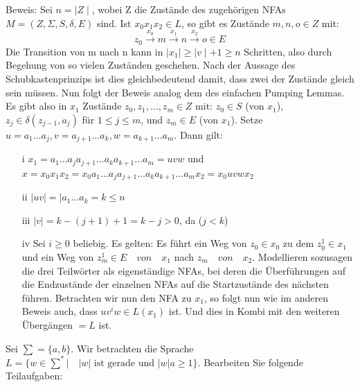 \documentclass[10pt, a4paper]{exam}
\begin{document}
\begin{questions}
\begin{solution}
        Beweis: Sei $n=\mid Z\mid$, wobei Z die Zustände des zugehörigen NFAs $M=(Z,\Sigma,S,\delta,E)$ sind. Ist $x_0x_1x_2 \in L$, so gibt es Zustände $m,n,o\in Z$ mit: $$z_0 \xrightarrow{x_0} m \xrightarrow{x_1} n \xrightarrow{x_2} o \in E$$
        Die Transition von m nach n kann in $\mid x_1\mid\geq\mid v\mid +1 \geq n$ Schritten, also durch Begehung von so vielen Zuständen geschehen. Nach der Aussage des Schubkastenprinzips ist dies gleichbedeutend damit, dass zwei der Zustände gleich sein müssen. Nun folgt der Beweis analog dem des einfachen Pumping Lemmas.\\
        Es gibt also in $x_1$ Zustände $z_0,z_1,…,z_m\in Z$ mit: $z_0\in S$ (von $x_1$), $z_j \in \delta(z_{j-1},a_j)$ für $1\leq j\leq m$, und $z_m\in E$ (von $x_1$).
        Setze $u = a_1 … a_j, v = a_{j+1}…a_k, w=a_{k+1}…a_m$.
        Dann gilt:
        \begin{itemize}
            \item[i] $x_1 = a_1…a_ja_{j+1}…a_ka_{k+1}…a_m = uvw$ und $x=x_0x_1x_2 = x_0a_1…a_ja_{j+1}…a_ka_{k+1}…a_mx_2 = x_0uvwx_2$
            \item[ii] $\mid uv\mid=\mid a_1…a_k = k \leq n$
            \item[iii] $\mid v\mid = k -(j+1)+1 = k-j > 0$, da ($j < k$)
            \item[iv] Sei $i\geq 0$ beliebig. Es gelten:
                  Es führt ein Weg von $z_0\in x_0$ zu dem $z_0^1 \in x_1$ und ein Weg von $z_m^1 \in E \quad von \quad x_1$ nach $z_m \quad von \quad x_2$. Modellieren sozusagen die drei Teilwörter als eigenständige NFAs, bei deren die Überführungen auf die Endzustände der einzelnen NFAs auf die Startzustände des nächsten führen. Betrachten wir nun den NFA zu $x_1$, so folgt nun wie im anderen Beweis auch, dass $uv^iw \in L(x_1)$ ist. Und dies in Kombi mit den weiteren Übergängen $=L$ ist.
        \end{itemize}
    \end{solution}

    \question Sei $\sum=\{a, b\}$. Wir betrachten die Sprache $L=\{w\in\sum^*\vert\quad |w| \text{ ist gerade und } |w| a \geq 1\}$. Bearbeiten Sie folgende Teilaufgaben:
\end{questions}
\end{document}
